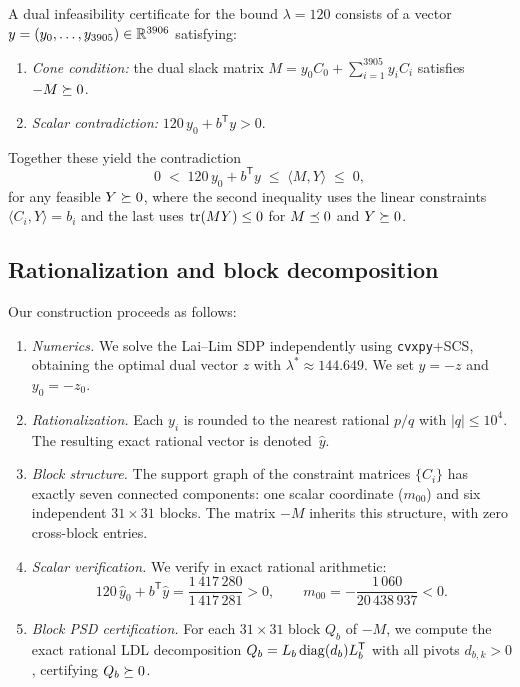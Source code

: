 A dual infeasibility certificate for the bound $\lambda=120$
consists of a vector $y=(y_0,\dots,y_{3905})\in\mathbb{R}^{3906}$
satisfying:
\begin{enumerate}[label=(\alph*),itemsep=2pt]
  \item \emph{Cone condition:} the dual slack matrix
    $M = y_0 C_0 + \sum_{i=1}^{3905} y_i C_i$
    satisfies $-M\succeq 0$.
  \item \emph{Scalar contradiction:}
    $120\,y_0 + b^{\mathsf{T}} y > 0$.
\end{enumerate}
Together these yield the contradiction
\[
  0
  \;<\; 120\,y_0 + b^{\mathsf{T}} y
  \;\le\; \langle M,Y\rangle
  \;\le\; 0,
\]
for any feasible $Y\succeq 0$, where the second inequality uses the
linear constraints $\langle C_i,Y\rangle = b_i$ and the last uses
$\operatorname{tr}(MY)\le 0$ for $M\preceq 0$ and $Y\succeq 0$.

\subsection{Rationalization and block decomposition}

Our construction proceeds as follows:
\begin{enumerate}[label=\arabic*.,itemsep=3pt]
  \item \emph{Numerics.}  We solve the Lai--Lim SDP independently
    using \texttt{cvxpy}+SCS, obtaining the optimal dual vector $z$
    with $\lambda^*\approx 144.649$.  We set $y = -z$ and
    $y_0 = -z_0$.

  \item \emph{Rationalization.}  Each $y_i$ is rounded to the nearest
    rational $p/q$ with $|q|\le 10^4$.  The resulting exact rational
    vector is denoted~$\hat{y}$.

  \item \emph{Block structure.}  The support graph of the constraint
    matrices $\{C_i\}$ has exactly seven connected components:
    one scalar coordinate ($m_{00}$) and six independent
    $31\times 31$ blocks.  The matrix $-M$ inherits this structure,
    with zero cross-block entries.

  \item \emph{Scalar verification.}  We verify in exact rational
    arithmetic:
    \[
      120\,\hat{y}_0 + b^{\mathsf{T}}\hat{y}
      = \frac{1\,417\,280}{1\,417\,281} > 0,
      \qquad
      m_{00} = -\frac{1\,060}{20\,438\,937} < 0.
    \]

  \item \emph{Block PSD certification.}  For each $31\times 31$ block
    $Q_b$ of $-M$, we compute the exact rational LDL decomposition
    $Q_b = L_b\operatorname{diag}(d_b)L_b^{\mathsf{T}}$ with all pivots
    $d_{b,k}>0$, certifying $Q_b\succeq 0$.
\end{enumerate}


